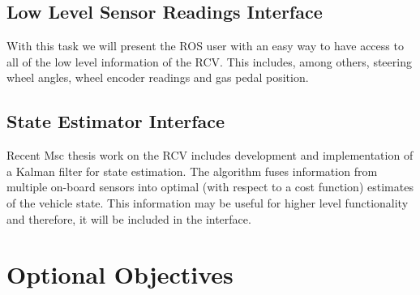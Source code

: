 \documentclass{article}
\begin{document}
\subsection{Low Level Sensor Readings Interface}

With this task we will present the ROS user with an easy way to have access to all of the low level information of the RCV. This includes, among others, steering wheel angles, wheel encoder readings and gas pedal position.


\subsection{State Estimator Interface}
Recent Msc thesis work on the RCV includes development and implementation of a Kalman filter for state estimation. The algorithm fuses information from multiple on-board sensors into optimal (with respect to a cost function) estimates of the vehicle state. This information may be useful for higher level functionality and therefore, it will be included in the interface.

\section{Optional Objectives} 
 
%
%
%
% 
%
 
%
\end{document}
